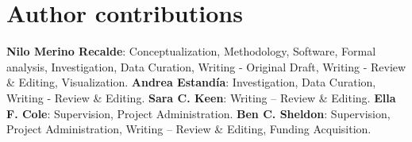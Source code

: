 \section{Author contributions}
\textbf{Nilo Merino Recalde}: Conceptualization, Methodology, Software, Formal analysis, Investigation, Data Curation, Writing - Original Draft, Writing - Review \& Editing, Visualization. 
\textbf{Andrea Estandía}: Investigation, Data Curation, Writing - Review \& Editing.
\textbf{Sara C. Keen}: Writing -- Review \& Editing.
\textbf{Ella F. Cole}: Supervision, Project Administration.
\textbf{Ben C. Sheldon}: Supervision, Project Administration, Writing -- Review \& Editing, Funding Acquisition.


\renewcommand{\cleardoublepage}{}
\renewcommand{\clearpage}{}
\printbibliography
